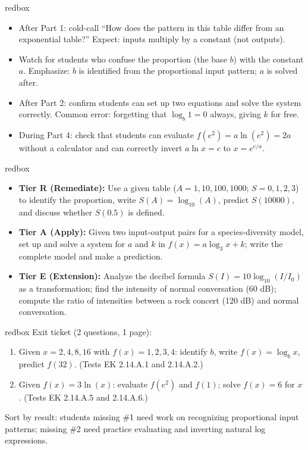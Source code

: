 \documentclass[10pt]{article}
\begin{document}
\begin{skillbox}{redbox}
\begin{itemize}[leftmargin=1.2em,itemsep=2pt,topsep=0pt]
  \item After Part 1: cold-call ``How does the pattern in this table differ from an exponential
        table?'' Expect: inputs multiply by a constant (not outputs).
  \item Watch for students who confuse the proportion (the base $b$) with the constant $a$.
        Emphasize: $b$ is identified from the proportional input pattern; $a$ is solved after.
  \item After Part 2: confirm students can set up two equations and solve the system correctly.
        Common error: forgetting that $\log_b 1 = 0$ always, giving $k$ for free.
  \item During Part 4: check that students can evaluate $f(e^2) = a\ln(e^2) = 2a$ without a
        calculator and can correctly invert $a\ln x = c$ to $x = e^{c/a}$.
\end{itemize}
\end{skillbox}

\begin{skillbox}{redbox}
\begin{itemize}[leftmargin=1.2em,itemsep=2pt,topsep=0pt]
  \item \textbf{Tier R (Remediate):} Use a given table ($A = 1,10,100,1000$; $S = 0,1,2,3$)
        to identify the proportion, write $S(A) = \log_{10}(A)$, predict $S(10000)$, and
        discuss whether $S(0.5)$ is defined.
  \item \textbf{Tier A (Apply):} Given two input-output pairs for a species-diversity model,
        set up and solve a system for $a$ and $k$ in $f(x) = a\log_3 x + k$; write the
        complete model and make a prediction.
  \item \textbf{Tier E (Extension):} Analyze the decibel formula $S(I) = 10\log_{10}(I/I_0)$
        as a transformation; find the intensity of normal conversation (60 dB); compute the
        ratio of intensities between a rock concert (120 dB) and normal conversation.
\end{itemize}
\end{skillbox}

\begin{skillbox}{redbox}
Exit ticket (2 questions, 1 page):
\begin{enumerate}[leftmargin=1.5em,itemsep=2pt,topsep=2pt]
  \item Given $x = 2, 4, 8, 16$ with $f(x) = 1, 2, 3, 4$: identify $b$, write
        $f(x) = \log_b x$, predict $f(32)$. (Tests EK 2.14.A.1 and 2.14.A.2.)
  \item Given $f(x) = 3\ln(x)$: evaluate $f(e^2)$ and $f(1)$; solve $f(x) = 6$ for $x$.
        (Tests EK 2.14.A.5 and 2.14.A.6.)
\end{enumerate}
Sort by result: students missing \#1 need work on recognizing proportional input patterns;
missing \#2 need practice evaluating and inverting natural log expressions.
\end{skillbox}
\end{document}
